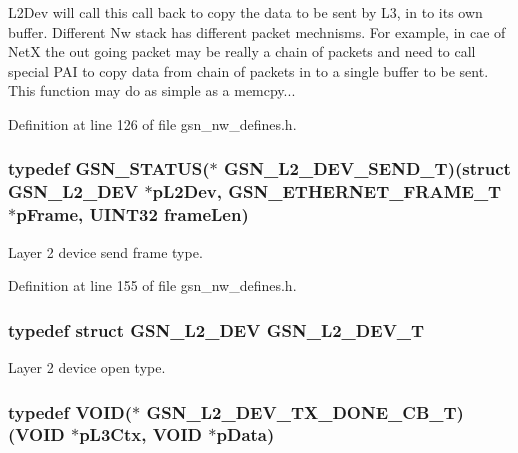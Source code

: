 L2Dev will call this call back to copy the data to be sent by L3, in to its own buffer. Different Nw stack has different packet mechnisms. For example, in cae of NetX the out going packet may be really a chain of packets and need to call special PAI to copy data from chain of packets in to a single buffer to be sent. This function may do as simple as a memcpy... 



Definition at line 126 of file gsn\_\-nw\_\-defines.h.

\hypertarget{a00670_gab40e032c5bca66cf4f59d6c8cfa82e0a}{
\subsubsection[{GSN\_\-L2\_\-DEV\_\-SEND\_\-T}]{\setlength{\rightskip}{0pt plus 5cm}typedef {\bf GSN\_\-STATUS}($\ast$ {\bf GSN\_\-L2\_\-DEV\_\-SEND\_\-T})(struct {\bf GSN\_\-L2\_\-DEV} $\ast$pL2Dev, {\bf GSN\_\-ETHERNET\_\-FRAME\_\-T} $\ast$pFrame, {\bf UINT32} frameLen)}}
\label{a00670_gab40e032c5bca66cf4f59d6c8cfa82e0a}


Layer 2 device send frame type. 



Definition at line 155 of file gsn\_\-nw\_\-defines.h.

\hypertarget{a00670_ga215517eb3a6f411a5378158abec2f574}{
\subsubsection[{GSN\_\-L2\_\-DEV\_\-T}]{\setlength{\rightskip}{0pt plus 5cm}typedef struct {\bf GSN\_\-L2\_\-DEV}  {\bf GSN\_\-L2\_\-DEV\_\-T}}}
\label{a00670_ga215517eb3a6f411a5378158abec2f574}


Layer 2 device open type. 

\hypertarget{a00670_ga4d5db18667f665fc99ec6171cf27b5be}{
\subsubsection[{GSN\_\-L2\_\-DEV\_\-TX\_\-DONE\_\-CB\_\-T}]{\setlength{\rightskip}{0pt plus 5cm}typedef VOID($\ast$  {\bf GSN\_\-L2\_\-DEV\_\-TX\_\-DONE\_\-CB\_\-T})(VOID $\ast$pL3Ctx, VOID $\ast$pData)}}
\label{a00670_ga4d5db18667f665fc99ec6171cf27b5be}


